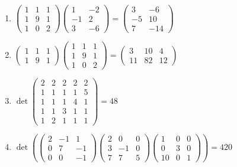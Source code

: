 \documentclass[11pt,a4paper]{article}
\begin{document}
\begin{enumerate}
\item $\displaystyle \begin{pmatrix} 1 & 1 & 1 \\ 1 & 9 & 1 \\ 1 & 0 & 2 \end{pmatrix} \begin{pmatrix} 1 & -2 \\ -1 & 2 \\ 3 & -6 \end{pmatrix} = \begin{pmatrix} 3 & -6 \\ -5 & 10 \\ 7 & -14 \end{pmatrix}$
\item $\displaystyle \begin{pmatrix} 1 & 1 & 1 \\ 1 & 9 & 1 \end{pmatrix} \begin{pmatrix} 1 & 1 & 1 \\ 1 & 9 & 1 \\ 1 & 0 & 2 \end{pmatrix} = \begin{pmatrix} 3 & 10 & 4 \\ 11 & 82 & 12 \end{pmatrix}$
\item $\displaystyle \det \begin{pmatrix} 2 & 2 & 2 & 2 & 2 \\ 1 & 1 & 1 & 1 & 5 \\ 1 & 1 & 1 & 4 & 1 \\ 1 & 1 & 3 & 1 & 1 \\ 1 & 2 & 1 & 1 & 1 \end{pmatrix} = 48$
\item $\displaystyle \det\left( \begin{pmatrix} 2 & -1 & 1 \\ 0 & 7 & -1 \\ 0 & 0 & -1 \end{pmatrix} \begin{pmatrix} 2 & 0 & 0 \\ 3 & -1 & 0 \\ 7 & 7 & 5 \end{pmatrix} \begin{pmatrix} 1 & 0 & 0 \\ 0 & 3 & 0 \\ 10 & 0 & 1 \end{pmatrix} \right) = 420$

\end{enumerate}
\end{document}
